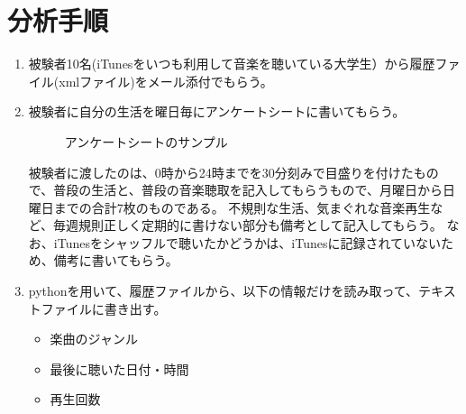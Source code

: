 \documentclass{jsarticle}
\begin{document}
\section{分析手順}
\begin{enumerate}
\item
被験者10名(iTunesをいつも利用して音楽を聴いている大学生）から履歴ファイル(xmlファイル)をメール添付でもらう。

\item
被験者に自分の生活を曜日毎にアンケートシートに書いてもらう。
\begin{figure}[htbp]
\begin{center}
\caption{アンケートシートのサンプル}
\end{center}
\end{figure}

被験者に渡したのは、0時から24時までを30分刻みで目盛りを付けたもので、普段の生活と、普段の音楽聴取を記入してもらうもので、月曜日から日曜日までの合計7枚のものである。
不規則な生活、気まぐれな音楽再生など、毎週規則正しく定期的に書けない部分も備考として記入してもらう。
なお、iTunesをシャッフルで聴いたかどうかは、iTunesに記録されていないため、備考に書いてもらう。
\item
pythonを用いて、履歴ファイルから、以下の情報だけを読み取って、テキストファイルに書き出す。
\begin{itemize}
\item
楽曲のジャンル
\item
最後に聴いた日付・時間
\item
再生回数
\end{itemize}


\end{enumerate}
\end{document}
